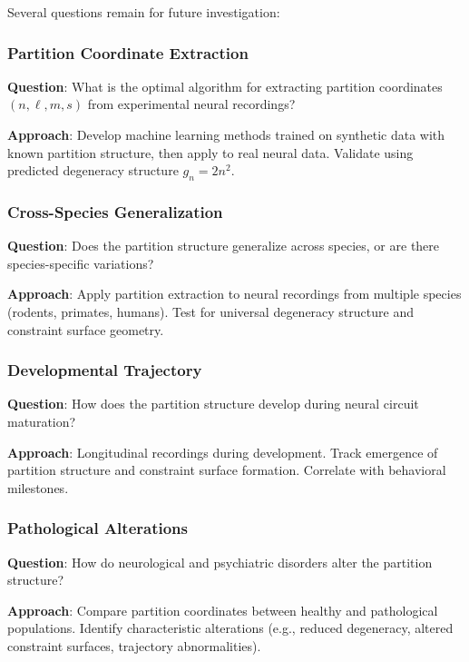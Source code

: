 \documentclass[aps,prd,twocolumn,superscriptaddress,floatfix,nofootinbib]{revtex4-2}
\theoremstyle{remark}
\begin{document}
Several questions remain for future investigation:

\subsubsection{Partition Coordinate Extraction}

\textbf{Question}: What is the optimal algorithm for extracting partition coordinates $(n, \ell, m, s)$ from experimental neural recordings?

\textbf{Approach}: Develop machine learning methods trained on synthetic data with known partition structure, then apply to real neural data. Validate using predicted degeneracy structure $g_n = 2n^2$.

\subsubsection{Cross-Species Generalization}

\textbf{Question}: Does the partition structure generalize across species, or are there species-specific variations?

\textbf{Approach}: Apply partition extraction to neural recordings from multiple species (rodents, primates, humans). Test for universal degeneracy structure and constraint surface geometry.

\subsubsection{Developmental Trajectory}

\textbf{Question}: How does the partition structure develop during neural circuit maturation?

\textbf{Approach}: Longitudinal recordings during development. Track emergence of partition structure and constraint surface formation. Correlate with behavioral milestones.

\subsubsection{Pathological Alterations}

\textbf{Question}: How do neurological and psychiatric disorders alter the partition structure?

\textbf{Approach}: Compare partition coordinates between healthy and pathological populations. Identify characteristic alterations (e.g., reduced degeneracy, altered constraint surfaces, trajectory abnormalities).
\end{document}
